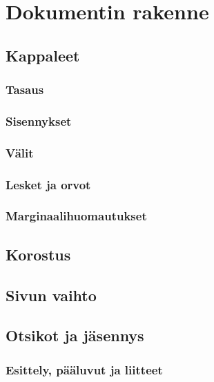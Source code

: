 \chapter{Dokumentin rakenne}
\section{Kappaleet}
\label{luku:kappale}

\subsection{Tasaus}
\subsection{Sisennykset}
\subsection{Välit}


\subsection{Lesket ja orvot}
\subsection{Marginaalihuomautukset}
\label{luku:marginaalihuomautukset}

\section{Korostus}
\section{Sivun vaihto}
\section{Otsikot ja jäsennys}
\label{luku:otsikot}

%

\subsection{Esittely, pääluvut ja liitteet}
\label{luku:frontmainbackmatter}

